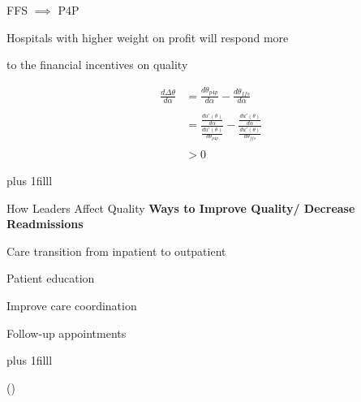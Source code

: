 \documentclass[notes,11pt, aspectratio=169]{beamer}
\newcommand{\btVFill}{\vskip0pt plus 1filll}
\newenvironment{wideitemize}{\itemize\addtolength{\itemsep}{10pt}}{\enditemize}
\begin{document}
\begin{frame}{FFS $\implies$ P4P}

\vspace{3mm{}}
    \large

        \begin{block}{}
        \centering \Large
        Hospitals with higher weight on profit will respond more
        
        to the financial incentives on quality
    \end{block}
    
    \begin{align*}
        \frac{d\Delta\theta}{d\alpha}&=\frac{d\theta_{p4p}}{d\alpha}-\frac{d\theta_{ffs}}{d\alpha}\\ 
        &\\
        &=\frac{\frac{du'(\theta)}{d\alpha}}{\frac{du'(\theta)}{d\theta_{p4p}}} - \frac{\frac{du'(\theta)}{d\alpha}}{\frac{du'(\theta)}{d\theta_{ffs}}}\\
        &\\
        &> 0
    \end{align*}

    \btVFill \normalsize
    \hyperlink{choiceofquality}{}
\end{frame}


\begin{frame}{How Leaders Affect Quality}\label{executivejob}
\large \vspace{5mm}
\textbf{Ways to Improve Quality/ Decrease Readmissions}

\vspace{2mm}

\begin{wideitemize}
    \item Care transition from inpatient to outpatient
    \item Patient education
    \item Improve care coordination
    \item Follow-up appointments
\end{wideitemize}

\btVFill

\scriptsize (\cite{silow2011reducing}) \hspace{4mm}
\hyperlink{nonprofithospexec}{}
    
\end{frame}
\end{document}
